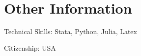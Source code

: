\documentclass[letterpaper]{article}
\renewenvironment{itemize}{
	\begin{list}{}{
			\setlength{\leftmargin}{1.5em}
		}
	}{
	\end{list}
}
\begin{document}
	\section*{Other Information}
	\begin{itemize}
		\item Technical Skills: Stata, Python, Julia, Latex
		\item Citizenship: USA
	\end{itemize}
	
	
	\bigskip
	
	
\end{document}
